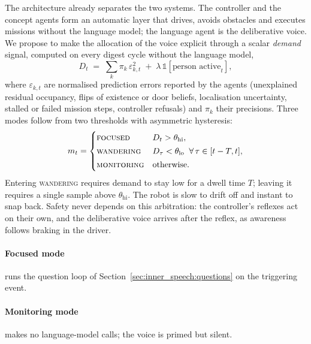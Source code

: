 The architecture already separates the two systems. The controller and the concept agents form an automatic layer
that drives, avoids obstacles and executes missions without the language model; the language agent is the
deliberative voice. We propose to make the allocation of the voice explicit through a scalar \emph{demand} signal,
computed on every digest cycle without the language model,
\begin{equation}
    D_t \;=\; \sum_{k} \pi_k\, \varepsilon_{k,t}^{2} \;+\; \lambda\, \mathbb{1}\!\left[\text{person active}_t\right],
    \label{eq:inner_demand}
\end{equation}
where $\varepsilon_{k,t}$ are normalised prediction errors reported by the agents (unexplained residual occupancy,
flips of existence or door beliefs, localisation uncertainty, stalled or failed mission steps, controller refusals)
and $\pi_k$ their precisions. Three modes follow from two thresholds with asymmetric hysteresis:
\begin{equation}
    m_t =
    \begin{cases}
        \textsc{focused}    & D_t > \theta_{\text{hi}},\\[2pt]
        \textsc{wandering}  & D_\tau < \theta_{\text{lo}} \;\; \forall\, \tau \in [t - T, t],\\[2pt]
        \textsc{monitoring} & \text{otherwise.}
    \end{cases}
    \label{eq:inner_modes}
\end{equation}
Entering \textsc{wandering} requires demand to stay low for a dwell time $T$; leaving it requires a single sample
above $\theta_{\text{hi}}$. The robot is slow to drift off and instant to snap back. Safety never depends on this
arbitration: the controller's reflexes act on their own, and the deliberative voice arrives after the reflex, as
awareness follows braking in the driver.

\paragraph{Focused mode} runs the question loop of Section~\ref{sec:inner_speech:questions} on the triggering
event. \paragraph{Monitoring mode} makes no language-model calls; the voice is primed but silent.

